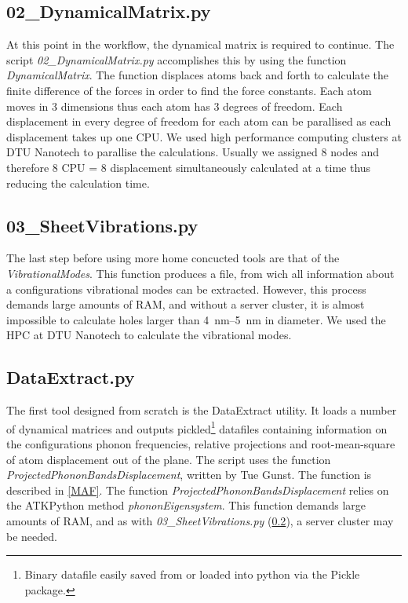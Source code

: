\subsection{02\_DynamicalMatrix.py}\label{02}
At this point in the workflow, the dynamical matrix is required to continue. The script \textit{02\_DynamicalMatrix.py} accomplishes this by using the function \textit{DynamicalMatrix}. The function displaces atoms back and forth to calculate the finite difference of the forces in order to find the force constants. Each atom moves in 3 dimensions thus each atom has 3 degrees of freedom. Each displacement in every degree of freedom for each atom can be parallised as each displacement takes up one CPU. We used high performance computing clusters at DTU Nanotech to parallise the calculations. Usually we assigned 8 nodes and therefore 8 CPU = 8 displacement simultaneously calculated at a time thus reducing the calculation time.

\subsection{03\_SheetVibrations.py}\label{03}
The last step before using more home concucted tools are that of the \textit{VibrationalModes}. This function produces a file, from wich all information about a configurations vibrational modes can be extracted. However, this process demands large amounts of RAM, and without a server cluster, it is almost impossible to calculate holes larger than \SIrange{4}{5}{\nm} in diameter. We used the HPC at DTU Nanotech to calculate the vibrational modes.
\subsection{DataExtract.py}\label{DE}
The first tool designed from scratch is the DataExtract utility. It loads a number of dynamical matrices and outputs pickled\footnote{Binary datafile easily saved from or loaded into python via the Pickle package.} datafiles containing information on the configurations phonon frequencies, relative projections and root-mean-square of atom displacement out of the plane. The script uses the function \textit{ProjectedPhononBandsDisplacement}, written by Tue Gunst. The function is described in \cref{MAF}.
The function \textit{ProjectedPhononBandsDisplacement} relies on the ATKPython method \textit{phononEigensystem}. This function demands large amounts of RAM, and as with \textit{03\_SheetVibrations.py} (\cref{03}), a server cluster may be needed.
